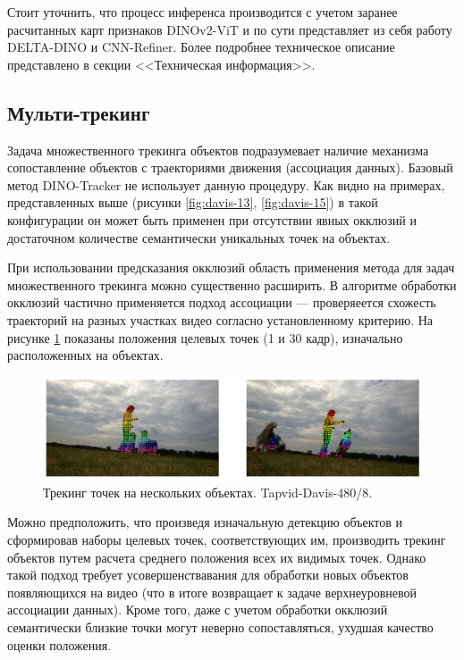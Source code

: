 \documentclass[a4paper, 14pt]{extarticle}
\theoremstyle{definition}
\theoremstyle{plain}
\theoremstyle{remark}
\begin{document}
Стоит уточнить, что процесс инференса производится с учетом заранее расчитанных карт признаков DINOv2-ViT и по сути представляет из себя работу DELTA-DINO и CNN-Refiner. Более подробнее техническое описание представлено в секции <<Техническая информация>>.

\subsection{Мульти-трекинг}
Задача множественного трекинга объектов подразумевает наличие механизма сопоставление объектов с траекториями движения (ассоциация данных). Базовый метод DINO-Tracker не использует данную процедуру. Как видно на примерах, представленных выше (рисунки \ref{fig:davis-13}, \ref{fig:davis-15}) в такой конфигурации он может быть применен при отсутствии явных окклюзий и достаточном количестве семантически уникальных точек на объектах.

При использовании предсказания окклюзий область применения метода для задач множественного трекинга можно существенно расширить. В алгоритме обработки окклюзий частично применяется подход ассоциации --- проверяеется схожесть траекторий на разных участках видео согласно установленному критерию. На рисунке \ref{fig:davis-8} показаны положения целевых точек (1 и 30 кадр), изначально расположенных на объектах.
\begin{figure}
    [H]
    \centering
    \includegraphics[width=\textwidth]{figs/davis-8.png}
    \caption{Трекинг точек на нескольких объектах. Tapvid-Davis-480/8.}
    \label{fig:davis-8}
\end{figure}

Можно предположить, что произведя изначальную детекцию объектов и сформировав наборы целевых точек, соответствующих им, производить трекинг объектов путем расчета среднего положения всех их видимых точек.
Однако такой подход требует усовершенствавания для обработки новых объектов появляющихся на видео (что в итоге возвращает к задаче верхнеуровневой ассоциации данных). Кроме того, даже с учетом обработки окклюзий семантически близкие точки могут неверно сопоставляться, ухудшая качество оценки положения.
\newpage
\end{document}
